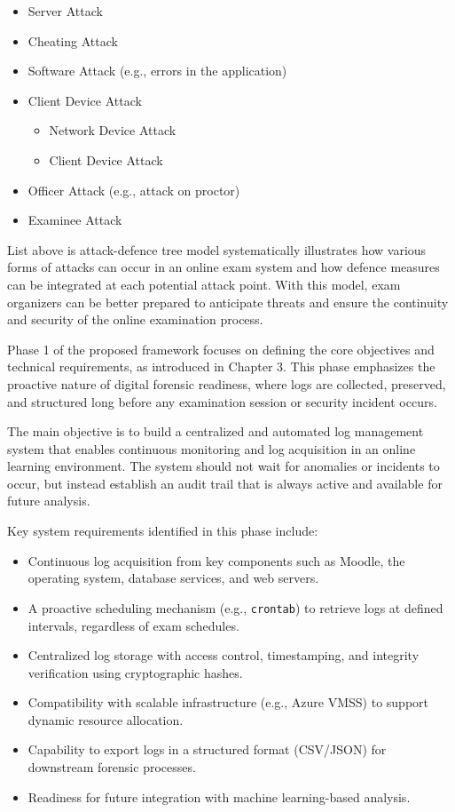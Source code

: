 \begin{itemize}
    \item Server Attack
    \item Cheating Attack
    \item Software Attack (e.g., errors in the application)
    \item Client Device Attack
        \begin{itemize}
            \item Network Device Attack
            \item Client Device Attack
        \end{itemize}
    \item Officer Attack (e.g., attack on proctor)
    \item Examinee Attack
\end{itemize}
List above \citet{rosmansyah2019attackdefensetreeonaeexamsystem} is attack-defence tree model systematically illustrates how various forms of attacks can occur in an online exam system and how defence measures can be integrated at each potential attack point. With this model, exam organizers can be better prepared to anticipate threats and ensure the continuity and security of the online examination process.




Phase 1 of the proposed framework focuses on defining the core objectives and technical requirements, as introduced in Chapter 3. This phase emphasizes the proactive nature of digital forensic readiness, where logs are collected, preserved, and structured long before any examination session or security incident occurs.

The main objective is to build a centralized and automated log management system that enables continuous monitoring and log acquisition in an online learning environment. The system should not wait for anomalies or incidents to occur, but instead establish an audit trail that is always active and available for future analysis.

Key system requirements identified in this phase include:

\begin{itemize}
    \item Continuous log acquisition from key components such as Moodle, the operating system, database services, and web servers.
    \item A proactive scheduling mechanism (e.g., \texttt{crontab}) to retrieve logs at defined intervals, regardless of exam schedules.
    \item Centralized log storage with access control, timestamping, and integrity verification using cryptographic hashes.
    \item Compatibility with scalable infrastructure (e.g., Azure VMSS) to support dynamic resource allocation.
    \item Capability to export logs in a structured format (CSV/JSON) for downstream forensic processes.
    \item Readiness for future integration with machine learning-based analysis.
\end{itemize}

